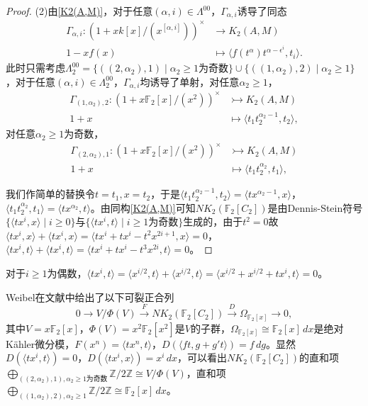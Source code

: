 \begin{proof}
	(2)由\ref{K2(A,M)}，对于任意$(\alpha,i)\in \Lambda^{00}$，$\Gamma_{\alpha,i}$诱导了同态
 \begin{align*}
 \Gamma_{\alpha,i} \colon (1+xk[x]/(x^{[\alpha,i]}))^{\times} &\longrightarrow K_2(A,M)\\
 1-xf(x) &\mapsto \langle f(t^\alpha)t^{\alpha-\epsilon^i},t_i \rangle.
 \end{align*}
 此时只需考虑$\Lambda^{00}_2=\{((2,\alpha_2),1)\mid  \alpha_2\geq 1\text{为奇数}\} \cup \{((1,\alpha_2),2)\mid  \alpha_2\geq 1\}$，对于任意$(\alpha,i)\in \Lambda^{00}_2$，$\Gamma_{\alpha,i}$均诱导了单射，对任意$\alpha_2\geq 1$，
  \begin{align*}
 \Gamma_{(1,\alpha_2),2} \colon (1+x \mathbb{F}_2[x]/(x^{2}))^{\times} &\rightarrowtail K_2(A,M)\\
 1+x &\mapsto %
 \langle t_1t_2^{\alpha_2-1},t_2 \rangle,
 \end{align*}
对任意$\alpha_2\geq 1$为奇数，
 \begin{align*}
 \Gamma_{(2,\alpha_2),1} \colon (1+x \mathbb{F}_2[x]/(x^{2}))^{\times} &\rightarrowtail K_2(A,M)\\
 1+x &\mapsto \langle t_1t_2^{\alpha_2},t_1 \rangle,
 \end{align*}

我们作简单的替换令$t=t_1, x=t_2$，于是$\langle t_1t_2^{\alpha_2-1},t_2 \rangle = \langle tx^{\alpha_2-1},x \rangle$，$\langle t_1t_2^{\alpha_2},t_1 \rangle=\langle t x^{\alpha_2},t  \rangle$。由同构\ref{K2(A,M)}可知$NK_2(\mathbb{F}_2[C_2])$是由Dennis-Stein符号$\{\langle tx^i,x \rangle \mid i\geq 0\}$与$\{\langle tx^i,t \rangle \mid i\geq 1\text{为奇数}\}$生成的，由于$t^2=0$故$\langle tx^i,x \rangle+\langle tx^i,x \rangle=\langle tx^i+tx^i-t^2x^{2i+1},x \rangle=0$，$\langle tx^i,t \rangle+\langle tx^i,t \rangle=\langle tx^i+tx^i-t^3x^{2i},t \rangle=0$。
\end{proof}
\begin{remark}
	对于$i\geq 1\text{为偶数}$，$\langle tx^i,t \rangle=\langle x^{i/2},t \rangle+\langle x^{i/2},t \rangle=\langle x^{i/2}+x^{i/2}+tx^i,t \rangle=0$。
\end{remark}

Weibel在文献\cite{weibel2009nk0}中给出了以下可裂正合列
	\[0\longrightarrow V/\Phi(V) \overset{F}\longrightarrow NK_2(\mathbb{F}_2[C_2])\overset{D}\longrightarrow \Omega_{\mathbb{F}_2[x]}\longrightarrow 0,\]
其中$V=x \mathbb{F}_2[x]$，$\Phi(V)=x^2 \mathbb{F}_2[x^2]$是$V$的子群，$\Omega_{\mathbb{F}_2[x]}\cong \mathbb{F}_2[x]\,d x$是绝对K\"{a}hler微分模，$F(x^n)=\langle tx^n,t \rangle$，$D(\langle ft,g+g't \rangle)=f\,dg$。显然$D(\langle tx^i,t \rangle)=0$，$D(\langle tx^i,x \rangle)=x^i\, dx$，可以看出$NK_2(\mathbb{F}_2[C_2])$的直和项$\bigoplus_{((2,\alpha_2),1), \alpha_2\geq 1\text{为奇数}} \mathbb{Z}/2\mathbb{Z} \cong V/\Phi(V)$，直和项$\bigoplus_{((1,\alpha_2),2), \alpha_2\geq 1} \mathbb{Z}/2\mathbb{Z} \cong \mathbb{F}_2[x]\,d x$。

